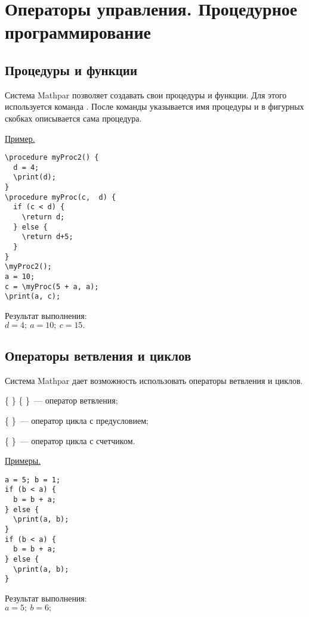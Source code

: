 \chapter{Операторы управления.  Процедурное программирование}

\section{Процедуры и функции}
Система Mathpar позволяет создавать свои процедуры и функции.  Для этого используется команда .  После команды указывается имя процедуры и в фигурных скобках описывается сама процедура. 

\smallskip

\underline{Пример.}

\vspace*{-3mm}
 
\begin{verbatim}
\procedure myProc2() {
  d = 4;
  \print(d);
}
\procedure myProc(c,  d) {
  if (c < d) {
    \return d;
  } else {
    \return d+5;
  }
}
\myProc2();
a = 10;
c = \myProc(5 + a, a);
\print(a, c);
\end{verbatim}

 Результат выполнения: \\
$d = 4;\  
a = 10;\  
c = 15.$ 

\section{Операторы ветвления и циклов}

 Система Mathpar дает возможность использовать операторы ветвления и циклов. 

\comm{if }{()} \{ \} \comm{else}{} \{ \}~--- оператор ветвления; 

\comm{while }{()} \{ \}~--- оператор цикла с предусловием; 

 \{ \}~--- оператор цикла с счетчиком.  

\smallskip

\underline{Примеры. }

\vspace*{-3mm}

\begin{verbatim}
a = 5; b = 1;
if (b < a) {
  b = b + a;
} else {
  \print(a, b);
}
if (b < a) {
  b = b + a;
} else {
  \print(a, b);
}
\end{verbatim}

Результат выполнения:\\
$a=5;\ b=6;$

